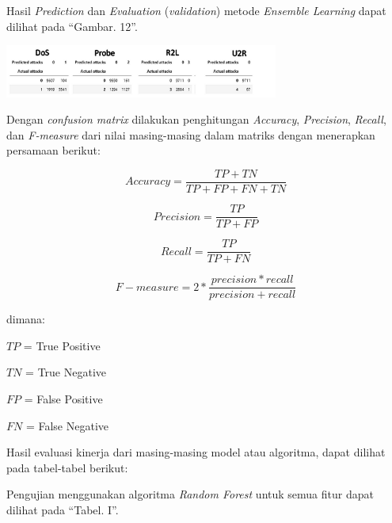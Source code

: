 \documentclass[conference]{IEEEtran}
\begin{document}
Hasil \emph{Prediction} dan \emph{Evaluation} (\emph{validation})
metode \emph{Ensemble Learning} dapat dilihat
pada ``Gambar. 12''.

\begin{minipage}{\linewidth}
\centerline{\includegraphics[width=90mm]{Gambar/Gbr010.jpg}}
\label{fig12}
\end{minipage}
\vspace{6pt}

Dengan \emph{confusion matrix} dilakukan penghitungan \emph{Accuracy}, \emph{Precision}, \emph{Recall},
dan \emph{F-measure} dari nilai masing-masing dalam matriks dengan menerapkan persamaan berikut:

\begin{equation*}
    Accuracy = \frac{TP + TN}{TP + FP + FN + TN}
    \label{eq6}
\end{equation*}

\begin{equation*}
    Precision = \frac{TP}{TP + FP}
    \label{eq7}
\end{equation*}

\begin{equation*}
    Recall = \frac{TP}{TP + FN}
    \label{eq8}
\end{equation*}

\begin{equation*}
    F-measure = 2 * \frac{precision * recall}{precision + recall}
    \label{eq9}
\end{equation*}

\noindent dimana:

\noindent $TP$ = True Positive

\noindent $TN$ = True Negative

\noindent $FP$ = False Positive

\noindent $FN$ = False Negative
\vspace{6pt}

Hasil evaluasi kinerja dari masing-masing model atau algoritma, dapat dilihat pada tabel-tabel berikut:

\noindent Pengujian menggunakan algoritma \emph{Random Forest} untuk semua fitur dapat dilihat pada ``Tabel. I''.\vspace{6pt}
\end{document}
